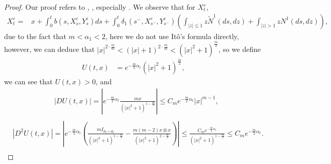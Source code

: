 \documentclass[11pt,reqno]{amsart}
\numberwithin{equation}{section}
\begin{document}
\begin{proof}
Our proof refers to \cite{LRSX},  \cite[Lemma A.1]{SXX}, especially \cite[Theorem 3.2]{KY}.	We observe that for $X_{t}^{\varepsilon} $,
	\begin{align*}
			X_{t}^{\varepsilon}=&x+\int_{0}^{t}b(s,X_{s}^{\varepsilon},Y_{s}^{\varepsilon})ds+\int_{0}^{t}\delta_{1}(s^{-},X_{s^{-}}^{\varepsilon},Y_{s^{-}}^{\varepsilon})\left( \int_{|z|\leq 1}z \tilde{N}^{1}(ds,dz)+\int_{|z|> 1}zN^{1}(ds,dz)\right),
	\end{align*}
due to the fact that $m<\alpha_{1}<2$, here we do not use It\^{o}'s formula directly, however,  we can deduce that $ |x|^{2\cdot \frac{m}{m}}<(|x|+1)^{2\cdot \frac{m}{m}}<(|x|^{2}+1)^{\frac{m}{2}}$, so we define  %
	\begin{equation}
		\begin{split}
			U(t,x)&=e^{-\frac{m}{2}\alpha_{t}}(|x|^{2}+1)^{\frac{m}{2}},
		\end{split}\nonumber
	\end{equation}
	we can see that  $U(t,x)>0$, and %
	\begin{equation}\label{du}
		\begin{split}
			&|DU(t,x)|=\left| e^{-\frac{m}{2}\alpha_{t}} \frac{mx}{(|x|^{2}+1)^{1-\frac{m}{2}}}\right|\leq C_{m} e^{-\frac{m}{2}\alpha_{t}}|x|^{m-1},\\
				\end{split}
		\end{equation}
	\begin{equation}\label{d2u}
	\begin{split}
			&|D^{2}U(t,x)|=\left| e^{-\frac{m}{2}\alpha_{t}}\left(  \frac{mI_{d_{2}\times d_{2} }}{(|x|^{2}+1)^{1-\frac{m}{2}}}-\frac{m(m-2)x\otimes x}{(|x|^{2}+1)^{2-\frac{m}{2}}}\right) \right|\leq \frac{C_{m}e^{-\frac{m}{2}\alpha_{t}}}{(|x|^{2}+1)^{1-\frac{m}{2}}}\leq C_{m}e^{-\frac{m}{2}\alpha_{t}}.\\
		\end{split}
	\end{equation}
	

\end{proof}
\end{document}
